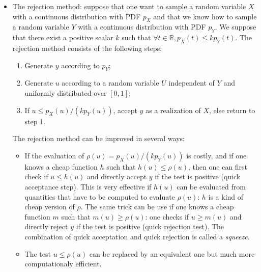 {\begin{itemize}
  \item The rejection method: suppose that one want to sample a random variable $X$ with a continuous distribution with PDF $p_X$ and that we know how to sample a random variable $Y$ with a continuous distribution with PDF $p_Y$. We suppose that there exist a positive scalar $k$ such that $\forall t\in\mathbb{R}, p_X(t)\leq kp_Y(t)$. The rejection method consists of the following steps:
    \begin{enumerate}
    \item Generate $y$ according to $p_Y$;
    \item Generate $u$ according to a random variable $U$ independent of $Y$ and uniformly distributed over $[0, 1]$;
    \item If $u\leq p_X(u)/(kp_Y(u))$, accept $y$ as a realization of $X$, else return to step 1.
    \end{enumerate}
    The rejection method can be improved in several ways:
    \begin{itemize}
    \item If the evaluation of $\rho(u)=p_X(u)/(kp_Y(u))$ is costly, and if one knows a cheap function $h$ such that $h(u) \leq \rho(u)$, then one can first check if $u\leq h(u)$ and directly accept $y$ if the test is positive (quick acceptance step). This is very effective if $h(u)$ can be evaluated from quantities that have to be computed to evaluate $\rho(u)$: $h$ is a kind of cheap version of $\rho$. The same trick can be use if one knows a cheap function $m$ such that $m(u) \geq \rho(u)$: one checks if $u\geq m(u)$ and directly reject $y$ if the test is positive (quick rejection test). The combination of quick acceptation and quick rejection is called a \emph{squeeze}.
    \item The test $u\leq \rho(u)$ can be replaced by an equivalent one but much more computationaly efficient.
    \end{itemize}


\end{itemize}}
